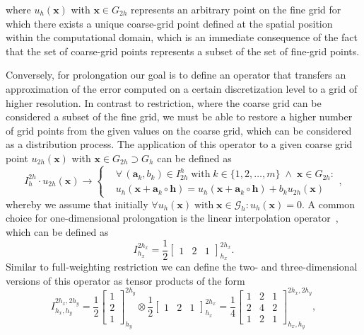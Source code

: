 where $u_h(\bm{x})$ with $\bm{x} \in G_{2h}$ represents an arbitrary point on the fine grid for which there exists a unique coarse-grid point defined at the spatial position within the computational domain, which is an immediate consequence of the fact that the set of coarse-grid points represents a subset of the set of fine-grid points.

Conversely, for prolongation our goal is to define an operator that transfers an approximation of the error computed on a certain discretization level to a grid of higher resolution.
In contrast to restriction, where the coarse grid can be considered a subset of the fine grid, we must be able to restore a higher number of grid points from the given values on the coarse grid, which can be considered as a distribution process.
The application of this operator to a given coarse grid point $u_{2h}(\bm{x})$ with $\bm{x} \in G_{2h} \supset G_h$ can be defined as
\begin{equation}
	I_{h}^{2h} \cdot u_{2h}(\bm{x}) \rightarrow
	\begin{cases}
		& \forall \, (\bm{a}_k, b_k) \in I_{2h}^{h} \; \text{with} \; k \in \{ 1, 2, \dots, m \} \; \wedge \; \bm{x} \in G_{2h} : \\
		& u_{h}(\bm{x} + \bm{a}_k \circ \bm{h}) = u_{h}(\bm{x} + \bm{a}_k \circ \bm{h}) + b_k u_{2h}(\bm{x}) 
	\end{cases},
	\label{eq:stencil-prolongation application}
\end{equation}
whereby we assume that initially $\forall u_h(\bm{x}) \; \text{with} \; \bm{x} \in \mathcal G_h : u_h(\bm{x}) = 0$.
A common choice for one-dimensional prolongation is the linear interpolation operator~\cite{trottenberg2000multigrid}, which can be defined as
\begin{equation}
	I_{h_x}^{2h_x} =  \frac{1}{2} \begin{bmatrix}
		1 & 2 & 1
	\end{bmatrix}_{h_x}^{2h_x}.
	\label{eq:linear-interpolation}
\end{equation}
Similar to full-weighting restriction we can define the two- and three-dimensional versions of this operator as tensor products of the form
\begin{equation}
	I_{h_x, h_y}^{2h_x, 2h_y} = \frac{1}{2} \begin{bmatrix}
		1 \\ 2 \\ 1
	\end{bmatrix}_{h_y}^{2h_y} \otimes \frac{1}{2} \begin{bmatrix}
		1 & 2 & 1
	\end{bmatrix}_{h_x}^{2h_x} =
	\frac{1}{4} 
	\begin{bmatrix}
		1 & 2 & 1 \\
		2 & 4 & 2 \\
		1 & 2 & 1
	\end{bmatrix}_{h_x, h_y}^{2h_x, 2h_y},
\end{equation}
